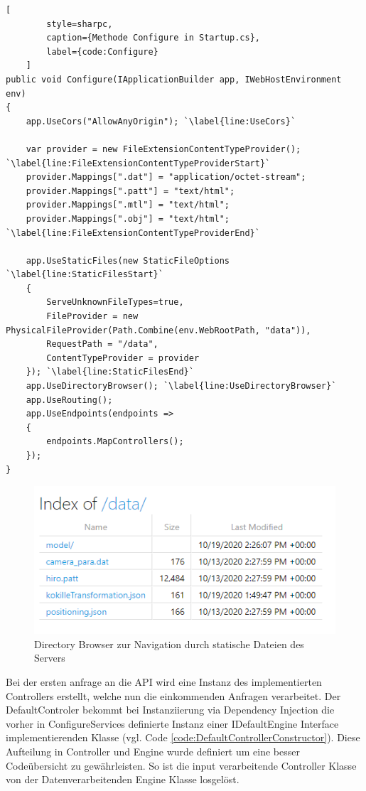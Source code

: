\begin{codeblock}
	\begin{lstlisting}[
		style=sharpc,
		caption={Methode Configure in Startup.cs},
		label={code:Configure}
	]
public void Configure(IApplicationBuilder app, IWebHostEnvironment env)
{
	app.UseCors("AllowAnyOrigin"); `\label{line:UseCors}`

	var provider = new FileExtensionContentTypeProvider(); `\label{line:FileExtensionContentTypeProviderStart}`
	provider.Mappings[".dat"] = "application/octet-stream";
	provider.Mappings[".patt"] = "text/html";
	provider.Mappings[".mtl"] = "text/html";
	provider.Mappings[".obj"] = "text/html"; `\label{line:FileExtensionContentTypeProviderEnd}`

	app.UseStaticFiles(new StaticFileOptions `\label{line:StaticFilesStart}`
	{
		ServeUnknownFileTypes=true,
		FileProvider = new PhysicalFileProvider(Path.Combine(env.WebRootPath, "data")),
		RequestPath = "/data",
		ContentTypeProvider = provider
	}); `\label{line:StaticFilesEnd}`
	app.UseDirectoryBrowser(); `\label{line:UseDirectoryBrowser}`
	app.UseRouting();
	app.UseEndpoints(endpoints =>
	{
		endpoints.MapControllers();
	});
}
	\end{lstlisting}
\end{codeblock}

\begin{figure}
	\centering
	\includegraphics[width=0.7\linewidth]{images/backend/DirectoryBrowser}
	\caption{Directory Browser zur Navigation durch statische Dateien des Servers}
	\label{fig:DirectoryBrowser}
\end{figure}

Bei der ersten anfrage an die API wird eine Instanz des implementierten
Controllers erstellt, welche nun die einkommenden Anfragen verarbeitet.
Der DefaultControler bekommt bei Instanziierung via Dependency Injection
die vorher in ConfigureServices definierte Instanz einer IDefaultEngine
Interface implementierenden Klasse
(vgl. Code \ref{code:DefaultControllerConstructor}).
Diese Aufteilung in Controller und Engine wurde definiert um eine besser
Codeübersicht zu gewährleisten. So ist die input verarbeitende Controller
Klasse von der Datenverarbeitenden Engine Klasse losgelöst.


